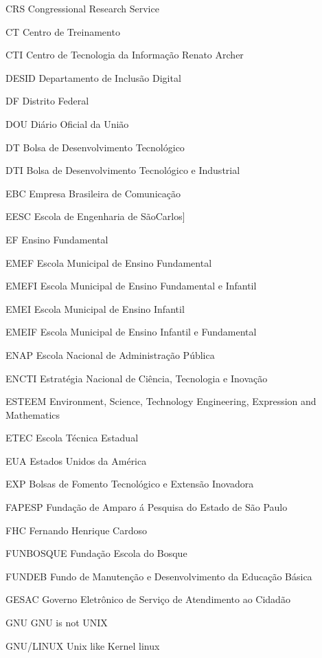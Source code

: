 \begin{siglas}
\item[CRS] Congressional Research Service
\item[CT] Centro de Treinamento
\item[CTI] Centro de Tecnologia da Informa\c{c}\~ao Renato Archer
\item[DESID] Departamento de Inclus\~ao Digital 
\item[DF] Distrito Federal
\item[DOU] Di\'ario Oficial da Uni\~ao
\item[DT] Bolsa de Desenvolvimento Tecnol\'ogico
\item[DTI]  Bolsa de Desenvolvimento Tecnol\'ogico e Industrial
\item[EBC] Empresa Brasileira de Comunica\c{c}\~ao
\item[EESC] Escola de Engenharia de S\~aoCarlos]
\item[EF] Ensino Fundamental
\item[EMEF] Escola Municipal de Ensino Fundamental
\item[EMEFI]  Escola Municipal de Ensino Fundamental e Infantil
\item[EMEI] Escola Municipal de Ensino Infantil
\item[EMEIF] Escola Municipal de Ensino Infantil e Fundamental
\item[ENAP] Escola Nacional de Administra\c{c}\~ao P\'ublica
\item[ENCTI] Estrat\'egia Nacional de Ci\^encia, Tecnologia e Inova\c{c}\~ao
\item[ESTEEM] Environment, Science, Technology Engineering, Expression and Mathematics
\item[ETEC] Escola T\'ecnica Estadual
\item[EUA] Estados Unidos da Am\'erica
\item[EXP] Bolsas de Fomento Tecnol\'ogico e Extens\~ao Inovadora
\item[FAPESP] Funda\c{c}\~ao de Amparo \'a Pesquisa do Estado de S\~ao Paulo
\item[FHC]  Fernando Henrique Cardoso
\item[FUNBOSQUE] Funda\c{c}\~ao Escola do Bosque
\item[FUNDEB] Fundo de Manuten\c{c}\~ao e Desenvolvimento da Educa\c{c}\~ao B\'asica
\item[GESAC] Governo Eletr\^onico de Servi\c{c}o de Atendimento ao Cidad\~ao 
\item[GNU] GNU is not UNIX
\item[GNU/LINUX] Unix like Kernel linux

\end{siglas}
